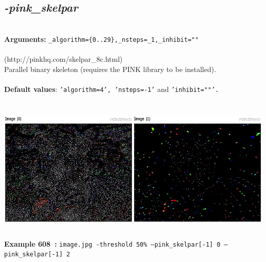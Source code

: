 \documentclass[a4paper,11pt,twoside]{book}
\begin{document}
\subsection{\emph{-pink\_skelpar} }\vspace*{-0.5em}
~\\\textbf{Arguments: } 
{\small \texttt{\_algorithm=\{0..29\},\_nsteps=\_1,\_inhibit=""}}\\~\\
(http://pinkhq.com/skelpar\_8c.html)
~\\Parallel binary skeleton (requires the PINK library to be installed).
~\\~\\\textbf{Default values}: {\small \texttt{'algorithm=4', 'nsteps=-1'} and \texttt{'inhibit=""'.}}
\begin{center}\includegraphics[keepaspectratio=true,height=7cm,width=\textwidth]{img/gmic_def608.jpg}\\
{\footnotesize \textbf{Example 608~:} \texttt{image.jpg -threshold 50\% --pink\_skelpar[-1] 0 --pink\_skelpar[-1] 2}}
\end{center}
\end{document}
